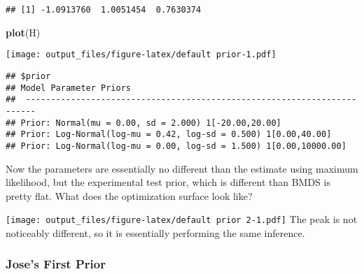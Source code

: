 \documentclass[]{article}
\newenvironment{Shaded}{\begin{snugshade}}{\end{snugshade}}
\newcommand{\DataTypeTok}[1]{\textcolor[rgb]{0.13,0.29,0.53}{#1}}
\newcommand{\DecValTok}[1]{\textcolor[rgb]{0.00,0.00,0.81}{#1}}
\newcommand{\KeywordTok}[1]{\textcolor[rgb]{0.13,0.29,0.53}{\textbf{#1}}}
\newcommand{\NormalTok}[1]{#1}
\newcommand{\OperatorTok}[1]{\textcolor[rgb]{0.81,0.36,0.00}{\textbf{#1}}}
\newcommand{\StringTok}[1]{\textcolor[rgb]{0.31,0.60,0.02}{#1}}
\begin{document}
\begin{Shaded}
\end{Shaded}

\begin{verbatim}
## [1] -1.0913760  1.0051454  0.7630374
\end{verbatim}

\begin{Shaded}
\begin{Highlighting}[]
\KeywordTok{plot}\NormalTok{(H)}
\end{Highlighting}
\end{Shaded}

\texttt{[image: output\_files/figure-latex/default prior-1.pdf]}

\begin{Shaded}
\end{Shaded}

\begin{verbatim}
## $prior
## Model Parameter Priors
##  ------------------------------------------------------------------------
## Prior: Normal(mu = 0.00, sd = 2.000) 1[-20.00,20.00]
## Prior: Log-Normal(log-mu = 0.42, log-sd = 0.500) 1[0.00,40.00]
## Prior: Log-Normal(log-mu = 0.00, log-sd = 1.500) 1[0.00,10000.00]
\end{verbatim}

Now the parameters are essentially no different than the estimate using
maximum likelihood, but the experimental test prior, which is different
than BMDS is pretty flat. What does the optimization surface look like?

\texttt{[image: output\_files/figure-latex/default prior 2-1.pdf]} The
peak is not noticeably different, so it is essentially performing the
same inference.

\hypertarget{joses-first-prior}{%
\subsubsection{Jose's First Prior}\label{joses-first-prior}}
\end{document}
